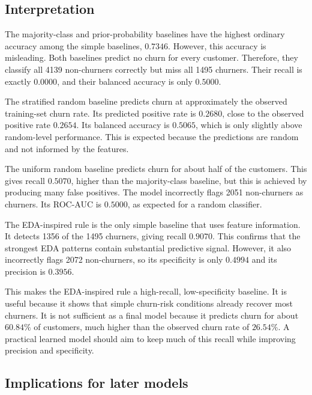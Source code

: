 \subsection{Interpretation}

The majority-class and prior-probability baselines have the highest ordinary accuracy among the simple baselines, \(0.7346\). However, this accuracy is misleading. Both baselines predict no churn for every customer. Therefore, they classify all 4139 non-churners correctly but miss all 1495 churners. Their recall is exactly \(0.0000\), and their balanced accuracy is only \(0.5000\).

The stratified random baseline predicts churn at approximately the observed training-set churn rate. Its predicted positive rate is \(0.2680\), close to the observed positive rate \(0.2654\). Its balanced accuracy is \(0.5065\), which is only slightly above random-level performance. This is expected because the predictions are random and not informed by the features.

The uniform random baseline predicts churn for about half of the customers. This gives recall \(0.5070\), higher than the majority-class baseline, but this is achieved by producing many false positives. The model incorrectly flags 2051 non-churners as churners. Its ROC-AUC is \(0.5000\), as expected for a random classifier.

The EDA-inspired rule is the only simple baseline that uses feature information. It detects 1356 of the 1495 churners, giving recall \(0.9070\). This confirms that the strongest EDA patterns contain substantial predictive signal. However, it also incorrectly flags 2072 non-churners, so its specificity is only \(0.4994\) and its precision is \(0.3956\).

This makes the EDA-inspired rule a high-recall, low-specificity baseline. It is useful because it shows that simple churn-risk conditions already recover most churners. It is not sufficient as a final model because it predicts churn for about \(60.84\%\) of customers, much higher than the observed churn rate of \(26.54\%\). A practical learned model should aim to keep much of this recall while improving precision and specificity.

\subsection{Implications for later models}

